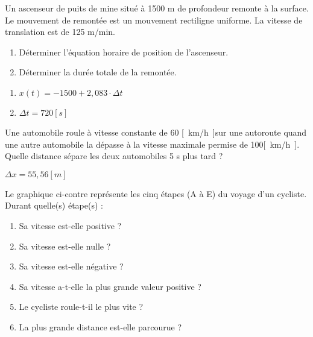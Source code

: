 \begin{exercise}
    Un ascenseur de puits de mine situé à 1500 m de profondeur remonte à la surface. Le mouvement de remontée est un mouvement rectiligne uniforme. La vitesse de translation est de 125 m/min.
    \begin{enumerate}[label=\alph*)]
        \item Déterminer l'équation horaire de position de l'ascenseur.
        \item Déterminer la durée totale de la remontée.
    \end{enumerate}
\end{exercise}
\begin{solution}
    \begin{enumerate}[label=\alph*)]
        \item \(x(t)=-1500 + 2,083 \cdot \Delta t\)
        \item \(\Delta t=720[s]\)
    \end{enumerate}
\end{solution}

\begin{exercise}
    Une automobile roule à vitesse constante de 60 \unit{[km/h]}sur une autoroute quand une autre automobile la dépasse à la vitesse maximale permise de 100\unit{[km/h]}. Quelle distance sépare les deux automobiles 5 s plus tard ?
\end{exercise}
\begin{solution}
    \(\Delta x=55,56\unit{[m]}\)
\end{solution}

\begin{exercise}
    Le graphique ci-contre représente les cinq étapes (A à E) du voyage d'un cycliste. Durant quelle(s) étape(s) :
    \begin{enumerate}[label=\alph*)]
        \item Sa vitesse est-elle positive ?
        \item Sa vitesse est-elle nulle ?
        \item Sa vitesse est-elle négative ?
        \item Sa vitesse a-t-elle la plus grande valeur positive ?
        \item Le cycliste roule-t-il le plus vite ?
        \item La plus grande distance est-elle parcourue ?
    \end{enumerate}

\end{exercise}
\begin{solution}
\end{solution}

